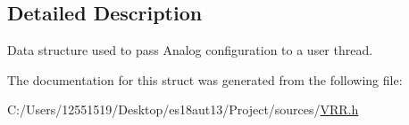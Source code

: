 \subsection{Detailed Description}
Data structure used to pass Analog configuration to a user thread. 



The documentation for this struct was generated from the following file\+:\begin{DoxyCompactItemize}
\item 
C\+:/\+Users/12551519/\+Desktop/es18aut13/\+Project/sources/\hyperlink{_v_r_r_8h}{V\+R\+R.\+h}\end{DoxyCompactItemize}
